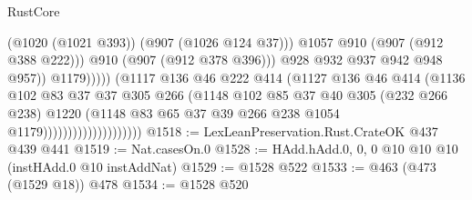 \begin{lexlean}{RustCore}
\begin{coremodule}
                                                      (@1020 (@1021 @393))
                                                      (@907 (@1026 @124 @37)))
                                                    @1057
                                                    @910
                                                    (@907 (@912 @388 @222)))
                                                  @910
                                                  (@907 (@912 @378 @396)))
                                                @928
                                                @932
                                                @937
                                                @942
                                                @948
                                                @957))
                                            @1179)))))
                                  (@1117
                                    @136
                                    @46
                                    @222
                                    @414
                                    (@1127
                                      @136
                                      @46
                                      @414
                                      (@1136
                                        @102
                                        @83
                                        @37
                                        @37
                                        @305
                                        @266
                                        (@1148
                                          @102
                                          @85
                                          @37
                                          @40
                                          @305
                                          (@232 @266 @238)
                                          @1220
                                          (@1148
                                            @83
                                            @65
                                            @37
                                            @39
                                            @266
                                            @238
                                            @1054
                                            @1179))))))))))))))))))))
@1518 := LexLeanPreservation.Rust.CrateOK @437 @439 @441
@1519 := Nat.casesOn.{0}
@1528 := HAdd.hAdd.{0, 0, 0} @10 @10 @10 (instHAdd.{0} @10 instAddNat)
@1529 := @1528 @522
@1533 := @463 (@473 (@1529 @18)) @478
@1534 := @1528 @520

\end{coremodule}
\end{lexlean}
